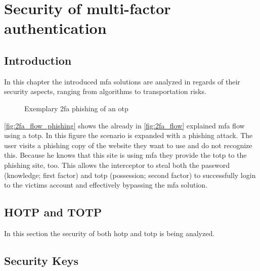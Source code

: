\chapter{Security of multi-factor authentication}

\section{Introduction}

In this chapter the introduced \gls{mfa} solutions are analyzed in regards of their security aspects, ranging from algorithms to transportation risks.

\begin{figure}[hbt]
	\centering
	
	\caption[Exemplary \gls{mfa} phishing of an \gls{otp}]{Exemplary \gls{2fa} phishing of an \gls{otp}\footnotemark}
	\label{fig:2fa_flow_phishing}
\end{figure}

\autoref{fig:2fa_flow_phishing} shows the already in \autoref{fig:2fa_flow} explained \gls{mfa} flow using a \gls{totp}. In this figure the scenario is expanded with a phishing attack. The user visits a phishing copy of the website they want to use and do not recognize this. Because he knows that this site is using \gls{mfa} they provide the \gls{totp} to the phishing site, too. This allows the interceptor to steal both the password (knowledge; first factor) and \gls{totp} (possession; second factor) to successfully login to the victims account and effectively bypassing the \gls{mfa} solution.

\section{HOTP and TOTP}
\label{sec:totp_sec}

In this section the security of both \gls{hotp} and \gls{totp} is being analyzed.



\section{Security Keys}
\label{sec:tokens}


